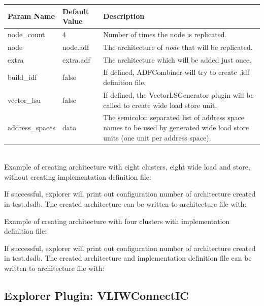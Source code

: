 \documentclass[twoside]{tceusermanual}
\begin{document}
\begin{tabular}{p{}p{}
                p{}}
\textbf{Param Name} &\textbf{Default Value} &\textbf{Description} \\
\hline
node\_count & 4 & Number of times the node is replicated. \\
node & node.adf & The architecture of \textit{node} that will be replicated. \\
extra & extra.adf & The architecture which will be added just once. \\
build\_idf & false & If defined, ADFCombiner will try to create .idf definition file. \\
vector\_lsu & false & If defined, the VectorLSGenerator plugin will be called to create wide load store unit. \\
address\_spaces & data & The semicolon separated list of address space names to be used by generated wide load store units (one unit per address space). \\ 
\end{tabular}\\

Example of creating architecture with eight clusters, eight wide load and store,  without creating implementation
definition file:


If successful, explorer will print out configuration number of architecture created in test.dsdb.
The created architecture can be written to architecture file with:


Example of creating architecture with four clusters with implementation
definition file:


If successful, explorer will print out configuration number of architecture created in test.dsdb.
The created architecture and implementation definition file can be written to architecture file with:


\subsection{Explorer Plugin: VLIWConnectIC}
\end{document}
